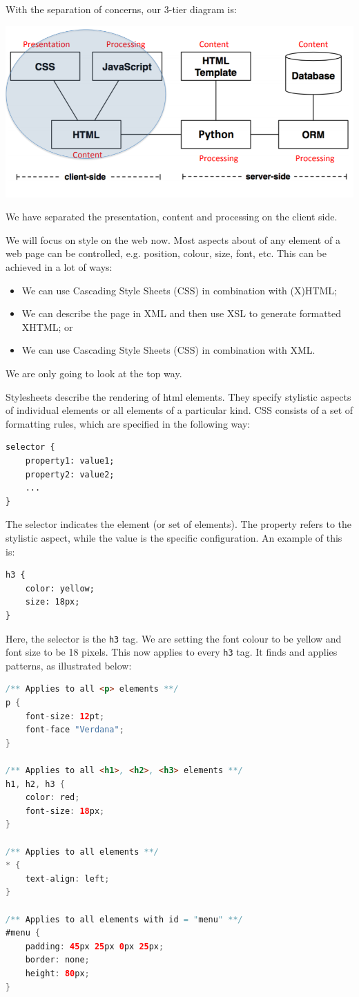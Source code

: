 \documentclass[a4paper, openany]{memoir}
\begin{document}
\noindent With the separation of concerns, our 3-tier diagram is:
\begin{center}
    \includegraphics[scale=0.6]{src/L10I5.PNG}
\end{center}
We have separated the presentation, content and processing on the client side. 

\noindent We will focus on style on the web now. Most aspects about of any element of a web page can be controlled, e.g. position, colour, size, font, etc. This can be achieved in a lot of ways:
\begin{itemize}
    \item We can use Cascading Style Sheets (CSS) in combination with (X)HTML;
    \item We can describe the page in XML and then use XSL to generate formatted XHTML; or
    \item We can use Cascading Style Sheets (CSS) in combination with XML.
\end{itemize}
We are only going to look at the top way.

\noindent Stylesheets describe the rendering of html elements. They specify stylistic aspects of individual elements or all elements of a particular kind. CSS consists of a set of formatting rules, which are specified in the following way:
\begin{lstlisting}
selector {
    property1: value1;
    property2: value2;
    ...
}
\end{lstlisting}
The selector indicates the element (or set of elements). The property refers to the stylistic aspect, while the value is the specific configuration. An example of this is:
\begin{lstlisting}
h3 {
    color: yellow;
    size: 18px;
}
\end{lstlisting}
Here, the selector is the \texttt{h3} tag. We are setting the font colour to be yellow and font size to be 18 pixels. This now applies to every \texttt{h3} tag. It finds and applies patterns, as illustrated below:
\begin{lstlisting}[language=java]
/** Applies to all <p> elements **/
p {
    font-size: 12pt;
    font-face "Verdana";
}

/** Applies to all <h1>, <h2>, <h3> elements **/
h1, h2, h3 {
    color: red;
    font-size: 18px;
}

/** Applies to all elements **/
* {
    text-align: left;
}

/** Applies to all elements with id = "menu" **/
#menu {
    padding: 45px 25px 0px 25px;
    border: none;
    height: 80px;
}
\end{lstlisting}
\end{document}
